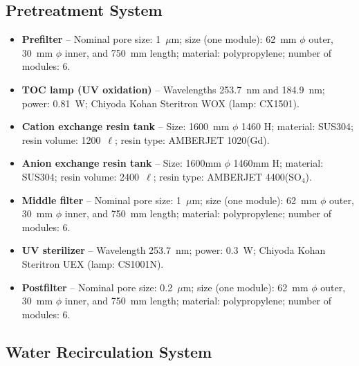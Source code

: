 \documentclass[preprint,12pt]{elsarticle}
\begin{document}
\subsection{Pretreatment System}



\begin{itemize}
    \item {\bf Prefilter} -- Nominal pore size: 1~$\mu$m; size (one module): 62~mm $\phi$ outer, 30~mm $\phi$ inner, and 750~mm length;  material: polypropylene; number of modules: 6.
    \item {\bf TOC lamp (UV oxidation)} -- Wavelengths 253.7~nm and 184.9~nm; power: 0.81~W; Chiyoda Kohan Steritron WOX (lamp: CX1501).
    \item {\bf Cation exchange resin tank} -- Size: 1600~mm $\phi$ 1460  H; material: SUS304; resin volume: 1200~$\ell$; resin type: AMBERJET 1020(Gd).
    \item {\bf Anion exchange resin tank} -- Size: 1600mm $\phi$ 1460mm H; material: SUS304; resin volume: 2400~$\ell$; resin type: AMBERJET 4400(SO$_4$).
    \item {\bf Middle filter} -- Nominal pore size: 1~$\mu$m; size (one module): 62~mm $\phi$ outer, 30~mm $\phi$ inner, and 750~mm length;  material: polypropylene;  number of modules: 6.
    \item {\bf UV sterilizer} --  Wavelength 253.7~nm; power: 0.3~W; Chiyoda Kohan Steritron UEX (lamp: CS1001N).
    \item {\bf Postfilter} -- Nominal pore size: 0.2~$\mu$m; size (one module): 62~mm $\phi$ outer, 30~mm $\phi$ inner, and 750~mm length;  material: polypropylene;  number of modules: 6.
\end{itemize}
\subsection{Water Recirculation System}
\end{document}

